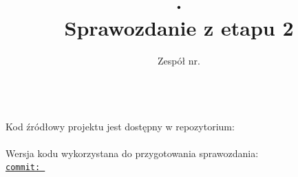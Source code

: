 \documentclass[12pt, a4paper]{article}
\title{\ProjectNumber. \ProjectTitle\\\large Sprawozdanie z etapu 2}
\author{Zespół nr. \TeamNumber \\ \AuthorOne \\ \AuthorTwo}
\date{}
\begin{document}
    \begin{titlepage}
       \maketitle

       \vfill

       \begin{center}
            \large
            Kod źródłowy projektu jest dostępny w repozytorium:\\[0.3cm]
            \href{\RepositoryURL}{\texttt{\RepositoryURL}}\\[0.6cm]

            Wersja kodu wykorzystana do przygotowania sprawozdania:\\[0.3cm]
            \href{\CommitURL}{\texttt{commit: \CommitHash}}
       \end{center}
    \end{titlepage}
    \clearpage

    \tableofcontents
    \clearpage

    \listoftables
    \clearpage

    \listoffigures
    \clearpage

    
    
    
    
    

    \clearpage
\end{document}
